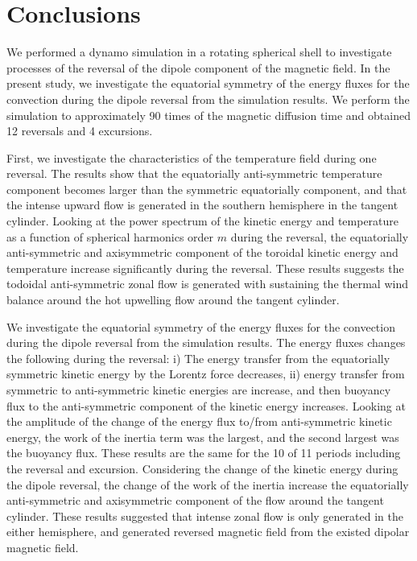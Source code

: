 \section{Conclusions}
\label{section:conclusions}

We performed a dynamo simulation in a rotating spherical shell to investigate processes of the reversal of the dipole component of the magnetic field. 
In the present study, we investigate the equatorial symmetry of the energy fluxes for the convection during the dipole reversal from the simulation results. 
We perform the simulation to approximately 90 times of the magnetic diffusion time and obtained 12 reversals and 4 excursions.

First, we investigate the characteristics of the temperature field during one reversal. 
The results show that the equatorially anti-symmetric temperature component becomes larger than the symmetric equatorially component, and that the intense upward flow is generated in the southern hemisphere in the tangent cylinder. 
Looking at the power spectrum of the kinetic energy and temperature as a function of spherical harmonics order $m$ during the reversal, the equatorially anti-symmetric and axisymmetric component of the toroidal kinetic energy and temperature increase significantly during the reversal. 
These results suggests the todoidal anti-symmetric zonal flow is generated with sustaining the thermal wind balance around the hot upwelling flow around the tangent cylinder.

We investigate the equatorial symmetry of the energy fluxes for the convection during the dipole reversal from the simulation results. 
The energy fluxes changes the following during the reversal: i) The energy transfer from the equatorially symmetric kinetic energy by the Lorentz force decreases, ii) energy transfer from symmetric to anti-symmetric kinetic energies are increase, and then buoyancy flux to the anti-symmetric component of the kinetic energy increases. 
Looking at the amplitude of the change of the energy flux to/from anti-symmetric kinetic energy, the work of the inertia term was the largest, and the second largest was the buoyancy flux. 
These results are the same for the 10 of 11 periods including the reversal and excursion. 
Considering the change of the kinetic energy during the dipole reversal, the change of the work of the inertia increase the equatorially anti-symmetric and axisymmetric component of the flow around the tangent cylinder. 
These results suggested that intense zonal flow is only generated in the either hemisphere, and generated reversed magnetic field from the existed dipolar magnetic field.